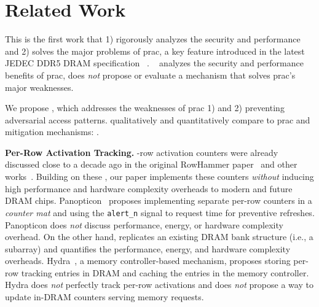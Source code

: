 \section{Related Work}
\label{sec:relatedwork}

This is the first work that
1) rigorously analyzes the security and performance and
2) solves the major problems of \gls{prac}, a key feature introduced in the latest JEDEC DDR5 DRAM specification~\cite{jedec2024jesd795c} .
~\cite{canpolat2024understanding} analyzes the security and performance benefits of \gls{prac},  does \emph{not} propose or evaluate a mechanism that solves \gls{prac}'s major weaknesses.

We propose \X{}, which addresses the  weaknesses of \gls{prac}  1)  and 2) preventing adversarial access patterns.
  qualitatively and quantitatively compare \X{} to \gls{prac} and  mitigation mechanisms: .

\noindent
\textbf{Per-Row Activation Tracking.}
-row activation counters were already discussed close to a decade ago in the original RowHammer paper~\cite{kim2014flipping} and other works~\cite{kim2014architectural,yaglikci2021security,bains2016distributed,bains2016row}.
Building on these , our paper implements these counters \emph{without} inducing high performance and hardware complexity overheads to modern and future DRAM chips.
Panopticon~\cite{bennett2021panopticon} proposes implementing separate per-row counters in a \emph{counter mat} and using the \texttt{alert\_n} signal to request time for preventive refreshes.
Panopticon does \emph{not} discuss performance, energy, or hardware complexity overhead.
On the other hand, \X{} replicates an existing DRAM bank structure (i.e., a subarray) and quantifies the performance, energy, and hardware complexity overheads.
Hydra~\cite{qureshi2022hydra}, a memory controller-based mechanism, proposes storing per-row tracking entries in DRAM and caching the entries in the memory controller.
Hydra does \emph{not} perfectly track per-row activations and does \emph{not} propose a way to update in-DRAM counters  serving memory requests.

